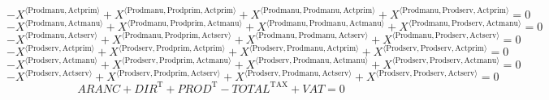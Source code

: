 \begin{equation}
-{X}^{\langle \mathrm{Prodmanu},\mathrm{Actprim}\rangle} + {X}^{\langle \mathrm{Prodmanu},\mathrm{Prodprim},\mathrm{Actprim}\rangle} + {X}^{\langle \mathrm{Prodmanu},\mathrm{Prodmanu},\mathrm{Actprim}\rangle} + {X}^{\langle \mathrm{Prodmanu},\mathrm{Prodserv},\mathrm{Actprim}\rangle} = 0
\end{equation}
\begin{equation}
-{X}^{\langle \mathrm{Prodmanu},\mathrm{Actmanu}\rangle} + {X}^{\langle \mathrm{Prodmanu},\mathrm{Prodprim},\mathrm{Actmanu}\rangle} + {X}^{\langle \mathrm{Prodmanu},\mathrm{Prodmanu},\mathrm{Actmanu}\rangle} + {X}^{\langle \mathrm{Prodmanu},\mathrm{Prodserv},\mathrm{Actmanu}\rangle} = 0
\end{equation}
\begin{equation}
-{X}^{\langle \mathrm{Prodmanu},\mathrm{Actserv}\rangle} + {X}^{\langle \mathrm{Prodmanu},\mathrm{Prodprim},\mathrm{Actserv}\rangle} + {X}^{\langle \mathrm{Prodmanu},\mathrm{Prodmanu},\mathrm{Actserv}\rangle} + {X}^{\langle \mathrm{Prodmanu},\mathrm{Prodserv},\mathrm{Actserv}\rangle} = 0
\end{equation}
\begin{equation}
-{X}^{\langle \mathrm{Prodserv},\mathrm{Actprim}\rangle} + {X}^{\langle \mathrm{Prodserv},\mathrm{Prodprim},\mathrm{Actprim}\rangle} + {X}^{\langle \mathrm{Prodserv},\mathrm{Prodmanu},\mathrm{Actprim}\rangle} + {X}^{\langle \mathrm{Prodserv},\mathrm{Prodserv},\mathrm{Actprim}\rangle} = 0
\end{equation}
\begin{equation}
-{X}^{\langle \mathrm{Prodserv},\mathrm{Actmanu}\rangle} + {X}^{\langle \mathrm{Prodserv},\mathrm{Prodprim},\mathrm{Actmanu}\rangle} + {X}^{\langle \mathrm{Prodserv},\mathrm{Prodmanu},\mathrm{Actmanu}\rangle} + {X}^{\langle \mathrm{Prodserv},\mathrm{Prodserv},\mathrm{Actmanu}\rangle} = 0
\end{equation}
\begin{equation}
-{X}^{\langle \mathrm{Prodserv},\mathrm{Actserv}\rangle} + {X}^{\langle \mathrm{Prodserv},\mathrm{Prodprim},\mathrm{Actserv}\rangle} + {X}^{\langle \mathrm{Prodserv},\mathrm{Prodmanu},\mathrm{Actserv}\rangle} + {X}^{\langle \mathrm{Prodserv},\mathrm{Prodserv},\mathrm{Actserv}\rangle} = 0
\end{equation}
\begin{equation}
{A\!R\!A\!N\!C} + {D\!I\!R}^{\mathrm{T}} + {P\!R\!O\!D}^{\mathrm{T}} - {T\!O\!T\!A\!L}^{\mathrm{TAX}} + {V\!A\!T} = 0
\end{equation}
